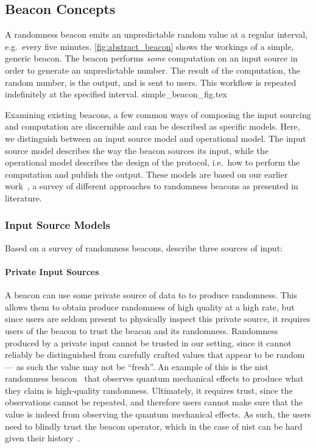 \subsection{Beacon Concepts}

A randomness beacon emits an unpredictable random value at a regular interval, e.g.\ every five minutes.
\cref{fig:abstract_beacon} shows the workings of a simple, generic beacon.
The beacon performs \emph{some} computation on an input source in order to generate an unpredictable number.
The result of the computation, the random number, is the output, and is sent to users.
This workflow is repeated indefinitely at the specified interval.
{simple_beacon_fig.tex}

Examining existing beacons, a few common ways of composing the input sourcing and computation are discernible and can be described as specific models.
Here, we distinguish between an input source model and operational model.
The input source model describes the way the beacon sources its input, while the operational model describes the design of the protocol, i.e.\ how to perform the computation and publish the output.
These models are based on our earlier work~\cite{worldsbestpaper}, a survey of different approaches to randomness beacons as presented in literature.

\subsubsection{Input Source Models}
Based on a survey of randomness beacons, \citet{worldsbestpaper} describe three sources of input:

\paragraph{Private Input Sources}
A beacon can use some private source of data to to produce randomness.
This allows them to obtain produce randomness of high quality at a high rate, but since users are seldom present to physically inspect this private source, it requires users of the beacon to trust the beacon and its randomness.
Randomness produced by a private input cannot be trusted in our setting, since it cannot reliably be distinguished from carefully crafted values that appear to be random --- as such the value may not be \enquote{fresh}.
An example of this is the \gls{nist} randomness beacon~\cite{nistbeacon} that observes quantum mechanical effects to produce what they claim is high-quality randomness.
Ultimately, it requires trust, since the observations cannot be repeated, and therefore users cannot make sure that the value is indeed from observing the quantum mechanical effects.
As such, the users need to blindly trust the beacon operator, which in the case of \gls{nist} can be hard given their history~\cite{nist2014backdoor, nytimes-nsaconstants, nytimes-nsabackdoors}.

